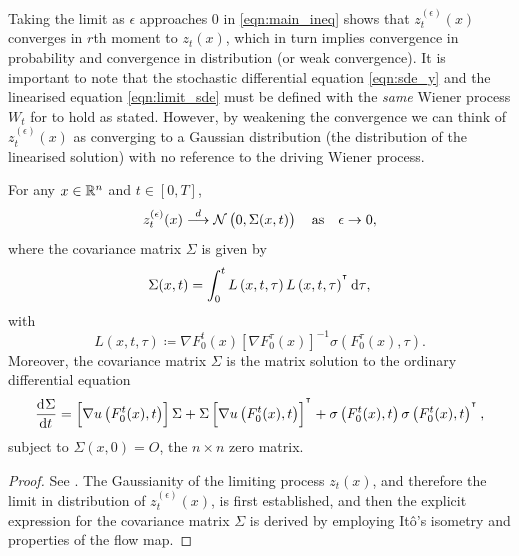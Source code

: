 Taking the limit as \(\epsilon\) approaches 0 in \eqref{eqn:main_ineq} shows that \(z_t^{(\epsilon)}(x)\) converges in \(r\)th moment to \(z_t(x)\), which in turn implies convergence in probability and convergence in distribution (or weak convergence). 
It is important to note that the stochastic differential equation \eqref{eqn:sde_y} and the linearised equation \eqref{eqn:limit_sde} must be defined with the \emph{same} Wiener process \(W_t\) for  to hold as stated.
However, by weakening the convergence we can think of \(z_t^{(\epsilon)}(x)\) as converging to a Gaussian distribution (the distribution of the linearised solution) with no reference to the driving Wiener process.

\begin{theorem}\label{thm:gauss_dist}
	For any \(x \in \mathbb{R}^n\) and \(t \in [0,T]\), 
	\[
		z_t^{(\epsilon)}(x)  \stackrel{d}{\longrightarrow} \mathcal{N}\left(0, \Sigma(x,t)\right) \quad \text{as} \quad \epsilon \to 0,
	\]
	where the covariance matrix \(\Sigma\) is given by
	\begin{equation}
		\Sigma(x,t) = \int_0^t{L\left(x, t, \tau\right)L\left(x, t, \tau\right)^{\T}\dif\tau},
		\label{eqn:sigma_calc}
	\end{equation}
	with
	\begin{equation}
		L\left(x, t, \tau\right) \coloneqq \nabla F_0^t(x) \left[\nabla F_0^\tau(x)\right]^{-1}\sigma\left(F_0^\tau(x), \tau\right).
		\label{eqn:sigma_L_def}
	\end{equation}
 Moreover, the covariance matrix \(\Sigma\) is the matrix solution to the ordinary differential equation
\begin{equation}
    \dod{\Sigma}{t} = \left[\nabla u\left(F_0^t(x), t\right)\right]\Sigma + \Sigma\left[\nabla u\left(F_0^t(x), t\right)\right]^{\T} + \sigma\left(F_0^t(x), t\right)\sigma\left(F_0^t(x), t\right)^{\T},
    \label{eqn:sigma_ode}
\end{equation}
subject to \(\Sigma(x,0) = O\), the \(n \times n\) zero matrix.
\end{theorem}
\begin{proof}
	See .
    The Gaussianity of the limiting process \(z_t(x)\), and therefore the limit in distribution of \(z_t^{(\epsilon)}(x)\), is first established, and then the explicit expression for the covariance matrix \(\Sigma\) is derived by employing It\^o's isometry and properties of the flow map.
\end{proof}

